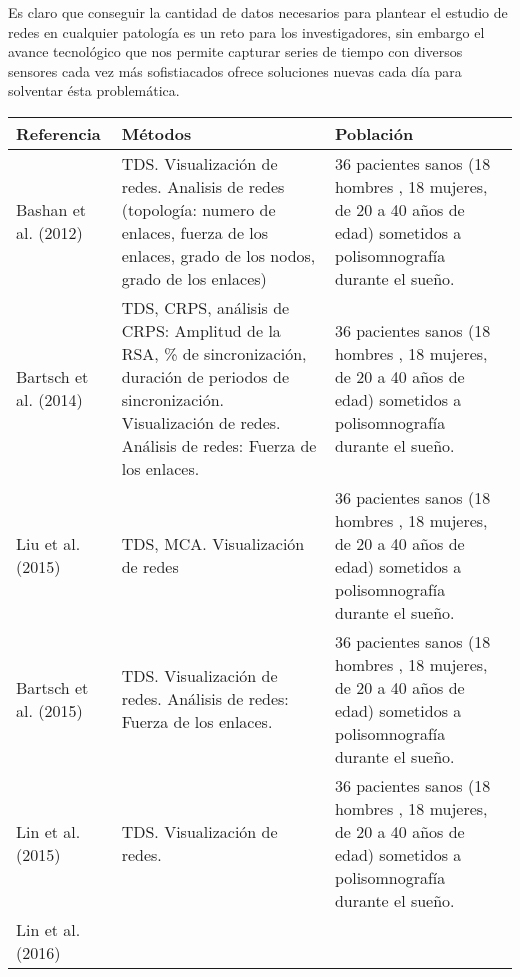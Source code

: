 \documentclass[twoside,twocolumn]{article}
\begin{document}
Es claro que conseguir la cantidad de datos necesarios para plantear el estudio de redes en cualquier patología es un reto para los investigadores, sin embargo el avance tecnológico que nos permite capturar series de tiempo con diversos sensores cada vez más sofistiacados ofrece soluciones nuevas cada día para solventar ésta problemática.


\onecolumn
\begin{center}
  \begin{longtable}{|p{}p{}p{}|}
    \hline
    \textbf{Referencia} & \textbf{Métodos} & \textbf{Población} \\
    \hline
    Bashan et al. (2012) \cite{bashan2012network} &
    TDS.
    Visualización de redes.
    Analisis de redes (topología: numero de enlaces, fuerza de los enlaces, grado de los nodos, grado de los enlaces)
    &
    36 pacientes sanos (18 hombres , 18 mujeres, de 20 a 40 años de edad) sometidos a polisomnografía durante el sueño.
    \\ \hline
    Bartsch et al. (2014)\cite{bartsch2014coexisting} &
    TDS, CRPS, análisis de CRPS: Amplitud de la RSA, \% de sincronización, duración de periodos de sincronización.
    Visualización de redes.
    Análisis de redes: Fuerza de los enlaces.
    &
    36 pacientes sanos (18 hombres , 18 mujeres, de 20 a 40 años de edad) sometidos a polisomnografía durante el sueño.
    \\ \hline
    Liu et al. (2015)\cite{liu2015major} &
    TDS, MCA.
    Visualización de redes
    &
    36 pacientes sanos (18 hombres , 18 mujeres, de 20 a 40 años de edad) sometidos a polisomnografía durante el sueño.
    \\ \hline
    Bartsch et al. (2015)\cite{bartsch2015network} &
    TDS.
    Visualización de redes.
    Análisis de redes: Fuerza de los enlaces.
    &
    36 pacientes sanos (18 hombres , 18 mujeres, de 20 a 40 años de edad) sometidos a polisomnografía durante el sueño.
    \\ \hline
    Lin et al. (2015) \cite{2015Plasticity} &
    TDS.
    Visualización de redes.
    &
    36 pacientes sanos (18 hombres , 18 mujeres, de 20 a 40 años de edad) sometidos a polisomnografía durante el sueño.
    \\ \hline
    Lin et al. (2016)\cite{lin2016delay} &

\end{longtable}
\end{center}
\end{document}
